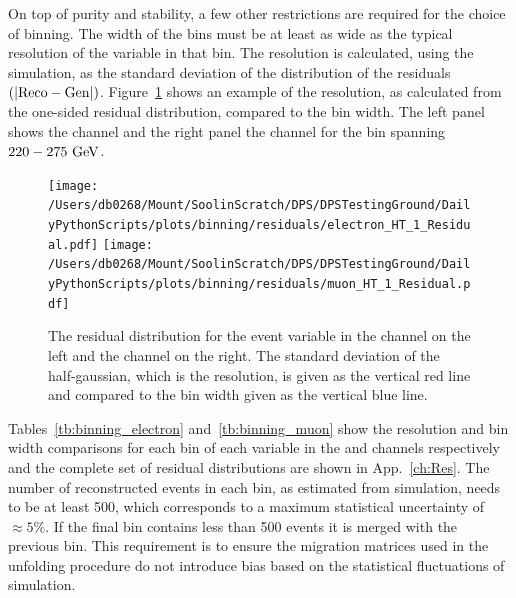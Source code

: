 On top of purity and stability, a few other restrictions are required for the choice of binning.
The width of the bins must be at least as wide as the typical resolution of the variable in that bin. 
The resolution is calculated, using the \powhegpythia{} simulation, as the standard deviation of the distribution of the residuals $(\lvert \mathrm{Reco}-\mathrm{Gen} \rvert)$.
Figure~\ref{fig:exampleRes} shows an example of the resolution, as calculated from the one-sided residual distribution, compared to the bin width.
The left panel shows the \eJets{} channel and the right panel the \muJets{} channel for the \HT{} bin spanning $220-275\mathrm{~Ge\hspace{-.08em}V}^{}$.
\begin{figure}[htpb]
	\centering
	\texttt{[image: /Users/db0268/Mount/SoolinScratch/DPS/DPSTestingGround/DailyPythonScripts/plots/binning/residuals/electron\_HT\_1\_Residual.pdf]}
	\texttt{[image: /Users/db0268/Mount/SoolinScratch/DPS/DPSTestingGround/DailyPythonScripts/plots/binning/residuals/muon\_HT\_1\_Residual.pdf]}
	\caption[The residual distribution for the \HT{} event variable in the \eJets{} channel on the left and the \muJets{} channel on the right. The standard deviation of the half-gaussian, which is the resolution, is given as the vertical red line and compared to the bin width given as the vertical blue line.]{The residual distribution for the \HT{} event variable in the \eJets{} channel on the left and the \muJets{} channel on the right. The standard deviation of the half-gaussian, which is the resolution, is given as the vertical red line and compared to the bin width given as the vertical blue line.}
	\label{fig:exampleRes}
\end{figure}
Tables~\ref{tb:binning_electron} and~\ref{tb:binning_muon} show the resolution and bin width comparisons for each bin of each variable in the \eJets{} and \muJets{} channels respectively and the complete set of residual distributions are shown in App.~\ref{ch:Res}.
The number of reconstructed \ttbar{} events in each bin, as estimated from simulation, needs to be at least 500, which corresponds to a maximum statistical uncertainty of $\approx5\%$.
If the final bin contains less than 500 events it is merged with the previous bin.
This requirement is to ensure the migration matrices used in the unfolding procedure do not introduce bias based on the statistical fluctuations of simulation.

